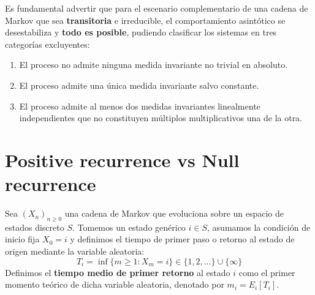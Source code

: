 \begin{observacion}
    Es fundamental advertir que para el escenario complementario de una cadena de Markov que sea \textbf{transitoria} e irreducible, el comportamiento asintótico se desestabiliza y \textbf{todo es posible}, pudiendo clasificar los sistemas en tres categorías excluyentes:
    \begin{enumerate}
        \item El proceso no admite ninguna medida invariante no trivial en absoluto.
        \item El proceso admite una única medida invariante salvo constante.
        \item El proceso admite al menos dos medidas invariantes linealmente independientes que no constituyen múltiplos multiplicativos una de la otra.
    \end{enumerate}
\end{observacion}

\section{Positive recurrence vs Null recurrence}
Sea $(X_n)_{n \geq 0}$ una cadena de Markov que evoluciona sobre un espacio de estados discreto $S$. Tomemos un estado genérico $i \in S$, asumamos la condición de inicio fija $X_0 = i$ y definimos el tiempo de primer paso o retorno al estado de origen mediante la variable aleatoria:
\[
T_i = \inf \{m \geq 1 : X_m = i\} \in \{1, 2, \dots\} \cup \{\infty\}
\]
Definimos el \textbf{tiempo medio de primer retorno} al estado $i$ como el primer momento teórico de dicha variable aleatoria, denotado por $m_i = E_i[T_i]$. \\

